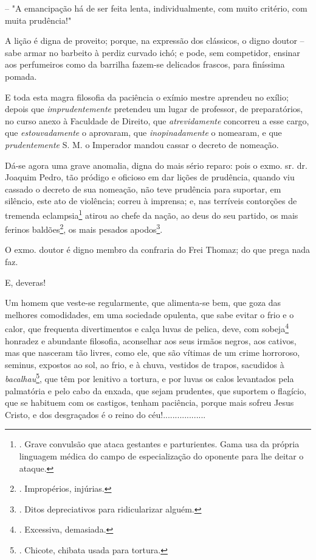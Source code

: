 -- "A emancipação há de ser feita lenta, individualmente, com muito
critério, com muita prudência!"

A lição é digna de proveito; porque, na expressão dos clássicos, o digno
doutor -- sabe armar no barbeito à perdiz curvado ichó; e pode, sem
competidor, ensinar aos perfumeiros como da barrilha fazem-se delicados
frascos, para finíssima pomada.

E toda esta magra filosofia da paciência o exímio mestre aprendeu no
exílio; depois que \emph{imprudentemente} pretendeu um lugar de
professor, de preparatórios, no curso anexo à Faculdade de Direito, que
\emph{atrevidamente} concorreu a esse cargo, que \emph{estouvadamente} o
aprovaram, que \emph{inopinadamente} o nomearam, e que
\emph{prudentemente} S. M. o Imperador mandou cassar o decreto de
nomeação.

Dá-se agora uma grave anomalia, digna do mais sério reparo: pois o exmo.
sr. dr. Joaquim Pedro, tão pródigo e oficioso em dar lições de
prudência, quando viu cassado o decreto de sua nomeação, não teve
prudência para suportar, em silêncio, este ato de violência; correu à
imprensa; e, nas terríveis contorções de tremenda eclampsia\footnote{.
  Grave convulsão que ataca gestantes e parturientes. Gama usa da
  própria linguagem médica do campo de especialização do oponente para
  lhe deitar o ataque.} atirou ao chefe da nação, ao deus do seu
partido, os mais ferinos baldões\footnote{. Impropérios, injúrias.}, os
mais pesados apodos\footnote{. Ditos depreciativos para ridicularizar
  alguém.}.

O exmo. doutor é digno membro da confraria do Frei Thomaz; do que prega
nada faz.

E, deveras!

Um homem que veste-se regularmente, que alimenta-se bem, que goza das
melhores comodidades, em uma sociedade opulenta, que sabe evitar o frio
e o calor, que frequenta divertimentos e calça luvas de pelica, deve,
com sobeja\footnote{. Excessiva, demasiada.} honradez e abundante
filosofia, aconselhar aos seus irmãos negros, aos cativos, mas que
nasceram tão livres, como ele, que são vítimas de um crime horroroso,
seminus, expostos ao sol, ao frio, e à chuva, vestidos de trapos,
sacudidos à \emph{bacalhau}\footnote{. Chicote, chibata usada para
  tortura.}, que têm por lenitivo a tortura, e por luvas os calos
levantados pela palmatória e pelo cabo da enxada, que sejam prudentes,
que suportem o flagício, que se habituem com os castigos, tenham
paciência, porque mais sofreu Jesus Cristo, e dos desgraçados é o reino
do céu!..................

